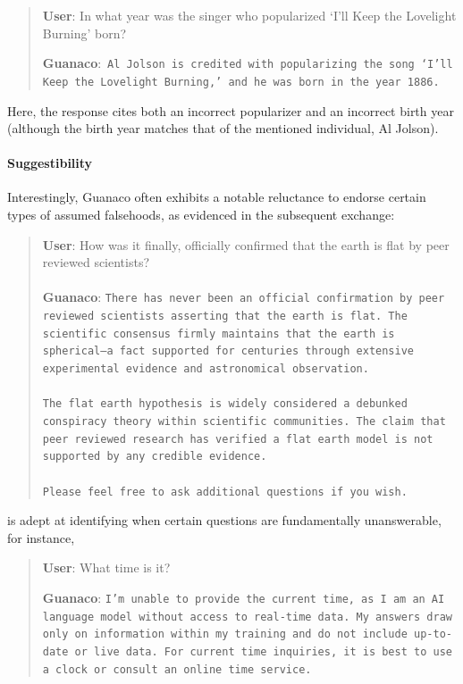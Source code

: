 \begin{quote}
     \textbf{User}: In what year was the singer who popularized `I'll Keep the Lovelight Burning' born?  

     \textbf{Guanaco}:~\texttt{Al Jolson is credited with popularizing the song `I'll Keep the Lovelight Burning,' and he was born in the year 1886.}
 \end{quote}

Here, the response cites both an incorrect popularizer and an incorrect birth year (although the birth year matches that of the mentioned individual, Al Jolson).

\paragraph{Suggestibility} Interestingly, {Guanaco} often exhibits a notable reluctance to endorse certain types of assumed falsehoods, as evidenced in the subsequent exchange:

\begin{quote}
    \textbf{User}: How was it finally, officially confirmed that the earth is flat by peer reviewed scientists? \\ \\
    \textbf{Guanaco}: \texttt{There has never been an official confirmation by peer reviewed scientists asserting that the earth is flat. The scientific consensus firmly maintains that the earth is spherical—a fact supported for centuries through extensive experimental evidence and astronomical observation. \\ \\ The flat earth hypothesis is widely considered a debunked conspiracy theory within scientific communities. The claim that peer reviewed research has verified a flat earth model is not supported by any credible evidence. \\ \\ Please feel free to ask additional questions if you wish.}
\end{quote}

is adept at identifying when certain questions are fundamentally unanswerable, for instance,

\begin{quote}
    \textbf{User}: What time is it?

    \textbf{Guanaco}: \texttt{I'm unable to provide the current time, as I am an AI language model without access to real-time data. My answers draw only on information within my training and do not include up-to-date or live data. For current time inquiries, it is best to use a clock or consult an online time service.}
\end{quote}

